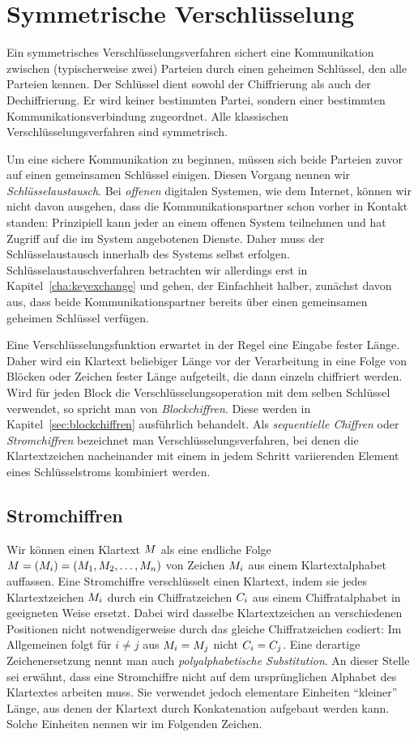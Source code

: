 \chapter{Symmetrische Verschlüsselung}
\label{cha:symencryption}
Ein symmetrisches Verschlüsselungsverfahren sichert eine Kommunikation zwischen (typischerweise zwei) Parteien durch einen geheimen Schlüssel, den alle Parteien kennen. Der Schlüssel dient sowohl der Chiffrierung als auch der Dechiffrierung. Er wird keiner bestimmten Partei, sondern einer bestimmten Kommunikationsverbindung zugeordnet. Alle klassischen Verschlüsselungsverfahren sind symmetrisch.

Um eine sichere Kommunikation zu beginnen, müssen sich beide Parteien zuvor auf einen gemeinsamen Schlüssel einigen. Diesen Vorgang nennen wir \emph{Schlüsselaustausch}. Bei \emph{offenen} digitalen Systemen, wie dem Internet, können wir nicht davon ausgehen, dass die Kommunikationspartner schon vorher in Kontakt standen: Prinzipiell kann jeder an einem offenen System teilnehmen und hat Zugriff auf die im System angebotenen Dienste. Daher muss der Schlüsselaustausch innerhalb des Systems selbst erfolgen. Schlüsselaustauschverfahren betrachten wir allerdings erst in Kapitel~\ref{cha:keyexchange} und gehen, der Einfachheit halber, zunächst davon aus, dass beide Kommunikationspartner bereits über einen gemeinsamen geheimen Schlüssel verfügen.

Eine Verschlüsselungsfunktion erwartet in der Regel eine Eingabe fester Länge. Daher wird ein Klartext beliebiger Länge vor der Verarbeitung in eine Folge von Blöcken oder Zeichen fester Länge aufgeteilt, die dann einzeln chiffriert werden. Wird für jeden Block die Verschlüsselungsoperation mit dem selben Schlüssel verwendet, so spricht man von \emph{Blockchiffren}. Diese werden in Kapitel~\ref{sec:blockchiffren} ausführlich behandelt. Als \emph{sequentielle Chiffren} oder \emph{Stromchiffren} bezeichnet man Verschlüsselungsverfahren, bei denen die Klartextzeichen nacheinander mit einem in jedem Schritt variierenden Element eines Schlüsselstroms kombiniert werden.

\section{Stromchiffren}
Wir können einen Klartext $M$ als eine endliche Folge $M = (M_i) = (M_1,M_2,\ldots,M_n) $ von Zeichen $M_i$ aus einem Klartextalphabet auffassen. Eine Stromchiffre verschlüsselt einen Klartext, indem sie jedes Klartextzeichen $M_i$ durch ein Chiffratzeichen $C_i$ aus einem Chiffratalphabet in geeigneten Weise ersetzt. Dabei wird dasselbe Klartextzeichen an verschiedenen Positionen nicht notwendigerweise durch das gleiche Chiffratzeichen codiert: Im Allgemeinen folgt für $i \ne j$ aus $M_i = M_j$ nicht $C_i = C_j$. Eine derartige Zeichenersetzung nennt man auch \emph{polyalphabetische Substitution}. An dieser Stelle sei erwähnt, dass eine Stromchiffre nicht auf dem ursprünglichen Alphabet des Klartextes arbeiten muss. Sie verwendet jedoch elementare Einheiten "`kleiner"' Länge, aus denen der Klartext durch Konkatenation aufgebaut werden kann. Solche Einheiten nennen wir im Folgenden Zeichen.

